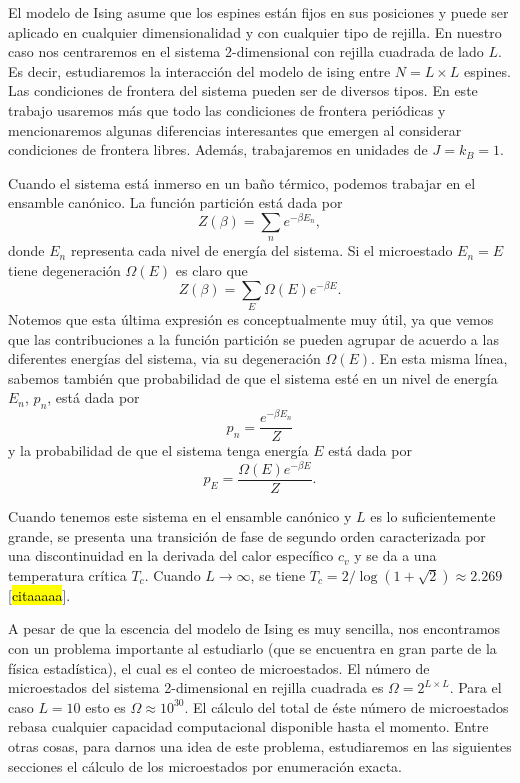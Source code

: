 \documentclass[%
 reprint,
 amsmath,amssymb,
 aps,
 pra,
]{revtex4-2}
\begin{document}
	El modelo de Ising asume que los espines están fijos en sus posiciones y puede ser aplicado en cualquier dimensionalidad y con cualquier tipo de rejilla. En nuestro caso nos centraremos en el sistema 2-dimensional con rejilla cuadrada de lado $L$. Es decir, estudiaremos la interacción del modelo de ising entre $N = L \times L$ espines. Las condiciones de frontera del sistema pueden ser de diversos tipos. En este trabajo usaremos más que todo las condiciones de frontera periódicas y mencionaremos algunas diferencias interesantes que emergen al considerar condiciones de frontera libres. Además, trabajaremos en unidades de $J=k_B=1$.

	Cuando el sistema está inmerso en un baño térmico, podemos trabajar en el ensamble canónico. La función partición está dada por 
		\begin{equation}
			Z(\beta) = \sum_n  e^{-\beta E_n}, 
		\end{equation}
	donde $E_n$ representa cada nivel de energía del sistema. Si el microestado $E_n = E$ tiene degeneración $\Omega(E)$ es claro que
		\begin{equation}
			Z(\beta) = \sum_E \Omega(E) e^{-\beta E}.
		\end{equation}
	Notemos que esta última expresión es conceptualmente muy útil, ya que vemos que las contribuciones a la función partición se pueden agrupar de acuerdo a las diferentes energías del sistema, via su degeneración $\Omega(E)$. En esta misma línea, sabemos también que probabilidad de que el sistema esté en un nivel de energía $E_n$, $p_n$, está dada por
		\begin{equation}
			p_n = \frac{e^{-\beta E_n}}{Z}
		\end{equation}
	y la probabilidad de que el sistema tenga energía $E$ está dada por
		\begin{equation}
			p_E = \frac{\Omega(E) e^{-\beta E}}{Z}. \label{eq:energy_prob}
		\end{equation}

	Cuando tenemos este sistema en el ensamble canónico y $L$ es lo suficientemente grande, se presenta una transición de fase de segundo orden caracterizada por una discontinuidad en la derivada del calor específico $c_v$ y se da a una temperatura crítica $T_c$. Cuando $L\rightarrow\infty$, se tiene $T_c = 2 / \log\left( 1 + \sqrt{2} \right) \approx 2.269$ [\hl{citaaaaa}].

	A pesar de que la escencia del modelo de Ising es muy sencilla, nos encontramos con un problema importante al estudiarlo (que se encuentra en gran parte de la física estadística), el cual es el conteo de microestados. El número de microestados del sistema 2-dimensional en rejilla cuadrada es $\Omega = 2^{L \times L}$. Para el caso $L=10$ esto es $\Omega \approx 10^30 $. El cálculo del total de éste número de microestados rebasa cualquier capacidad computacional disponible hasta el momento.
	Entre otras cosas, para darnos una idea de este problema, estudiaremos en las siguientes secciones el cálculo de los microestados por enumeración exacta.
\end{document}
